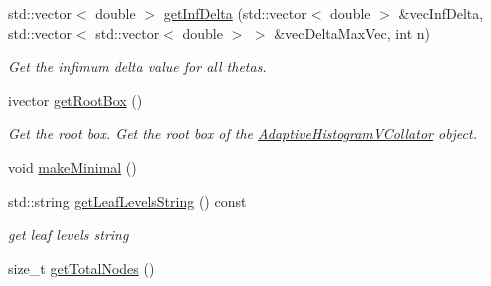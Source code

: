 \begin{DoxyCompactItemize}
\item 
std\-::vector$<$ double $>$ \hyperlink{classsubpavings_1_1AdaptiveHistogramVCollator_ab121bb960439438575c2115944990724}{get\-Inf\-Delta} (std\-::vector$<$ double $>$ \&vec\-Inf\-Delta, std\-::vector$<$ std\-::vector$<$ double $>$ $>$ \&vec\-Delta\-Max\-Vec, int n)
\begin{DoxyCompactList}\small\item\em \-Get the infimum delta value for all thetas. \end{DoxyCompactList}\item 
ivector \hyperlink{classsubpavings_1_1AdaptiveHistogramVCollator_a53105611d6db4dc208275fd049475cd6}{get\-Root\-Box} ()
\begin{DoxyCompactList}\small\item\em \-Get the root box. \-Get the root box of the \hyperlink{classsubpavings_1_1AdaptiveHistogramVCollator}{\-Adaptive\-Histogram\-V\-Collator} object. \end{DoxyCompactList}\item 
void \hyperlink{classsubpavings_1_1AdaptiveHistogramVCollator_ab9c2ad2ebbf0f50de0e06f92f222f0a7}{make\-Minimal} ()
\item 
std\-::string \hyperlink{classsubpavings_1_1AdaptiveHistogramVCollator_a503d9bbe2f7854466570bad4fd2d0d42}{get\-Leaf\-Levels\-String} () const 
\begin{DoxyCompactList}\small\item\em get leaf levels string \end{DoxyCompactList}\item 
size\-\_\-t \hyperlink{classsubpavings_1_1AdaptiveHistogramVCollator_a49437661609894461106a99c37ddeed5}{get\-Total\-Nodes} ()
\end{DoxyCompactItemize}

